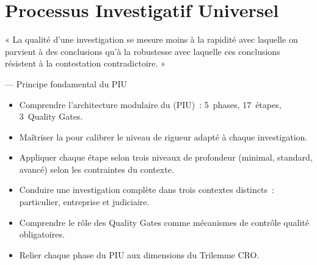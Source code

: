 
\chapter{Processus Investigatif Universel}
\label{chap:PIU}

\epigraph{%
    « La qualité d'une investigation se mesure moins à la rapidité avec
    laquelle on parvient à des conclusions qu'à la robustesse avec laquelle
    ces conclusions résistent à la contestation contradictoire. »%
}{--- Principe fondamental du PIU}


\begin{boxobjectifs}
\begin{itemize}
    \item Comprendre l'architecture modulaire du  (PIU)~: 5~phases, 17~étapes, 3~Quality Gates.
    \item Maîtriser la  pour calibrer le niveau
          de rigueur adapté à chaque investigation.
    \item Appliquer chaque étape selon trois niveaux de profondeur (minimal,
          standard, avancé) selon les contraintes du contexte.
    \item Conduire une investigation complète dans trois contextes distincts~:
          particulier, entreprise et judiciaire.
    \item Comprendre le rôle des Quality Gates comme mécanismes de contrôle
          qualité obligatoires.
    \item Relier chaque phase du PIU aux dimensions du Trilemme CRO.
\end{itemize}
\end{boxobjectifs}

